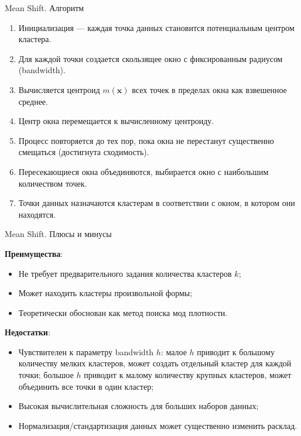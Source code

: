 \documentclass[unicode, notheorems, handout]{beamer}
\begin{document}
\begin{frame}{Mean Shift. Алгоритм}
    \begin{enumerate}
        \item Инициализация --- каждая точка данных становится потенциальным центром кластера.
        \item Для каждой точки создается скользящее окно с фиксированным радиусом (bandwidth).
        \item Вычисляется центроид $m(\pmb{x})$ всех точек в пределах окна как взвешенное среднее.
        \item Центр окна перемещается к вычисленному центроиду.
        \item Процесс повторяется до тех пор, пока окна не перестанут существенно смещаться (достигнута сходимость).
        \item Пересекающиеся окна объединяются, выбирается окно с наибольшим количеством точек.
        \item Точки данных назначаются кластерам в соответствии с окном, в котором они находятся.
        \end{enumerate}
\end{frame}


\begin{frame}{Mean Shift. Плюсы и минусы}
    
\textbf{Преимущества}:
\begin{itemize}
    \item Не требует предварительного задания количества кластеров $k$;
    \item Может находить кластеры произвольной формы; 
    \item Теоретически обоснован как метод поиска мод плотности.
\end{itemize}
\vspace{1ex}

\textbf{Недостатки}:
\begin{itemize}
    \item Чувствителен к параметру bandwidth $h$: малое $h$ приводит к большому количеству мелких кластеров, может создать отдельный кластер для каждой точки; большое $h$ приводит к малому количеству крупных кластеров, может объединить все точки в один кластер;

    \item Высокая вычислительная сложность для больших наборов данных;

    \item Нормализация/стандартизация данных может существенно изменить расклад.
    \end{itemize}
\end{frame}
\end{document}
